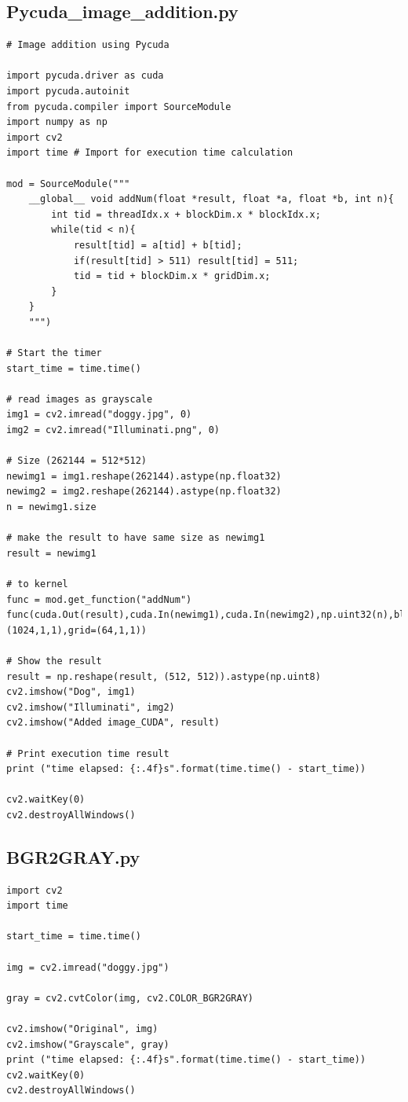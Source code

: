 \documentclass[11pt]{article}
\begin{document}
\subsection*{Pycuda\_image\_addition.py}
\begin{lstlisting}
# Image addition using Pycuda

import pycuda.driver as cuda
import pycuda.autoinit
from pycuda.compiler import SourceModule
import numpy as np
import cv2
import time # Import for execution time calculation

mod = SourceModule("""
    __global__ void addNum(float *result, float *a, float *b, int n){
        int tid = threadIdx.x + blockDim.x * blockIdx.x;
        while(tid < n){
            result[tid] = a[tid] + b[tid];
            if(result[tid] > 511) result[tid] = 511;
            tid = tid + blockDim.x * gridDim.x;
        }
    }
    """)

# Start the timer
start_time = time.time()

# read images as grayscale
img1 = cv2.imread("doggy.jpg", 0)
img2 = cv2.imread("Illuminati.png", 0)

# Size (262144 = 512*512)
newimg1 = img1.reshape(262144).astype(np.float32)
newimg2 = img2.reshape(262144).astype(np.float32)
n = newimg1.size

# make the result to have same size as newimg1
result = newimg1

# to kernel
func = mod.get_function("addNum")
func(cuda.Out(result),cuda.In(newimg1),cuda.In(newimg2),np.uint32(n),block=(1024,1,1),grid=(64,1,1))

# Show the result
result = np.reshape(result, (512, 512)).astype(np.uint8)
cv2.imshow("Dog", img1)
cv2.imshow("Illuminati", img2)
cv2.imshow("Added image_CUDA", result)

# Print execution time result
print ("time elapsed: {:.4f}s".format(time.time() - start_time))

cv2.waitKey(0)
cv2.destroyAllWindows()

\end{lstlisting}


\newpage
\subsection*{BGR2GRAY.py}
\begin{lstlisting}
import cv2
import time

start_time = time.time()

img = cv2.imread("doggy.jpg")

gray = cv2.cvtColor(img, cv2.COLOR_BGR2GRAY)

cv2.imshow("Original", img)
cv2.imshow("Grayscale", gray)
print ("time elapsed: {:.4f}s".format(time.time() - start_time))
cv2.waitKey(0)
cv2.destroyAllWindows()
\end{lstlisting}
\end{document}

